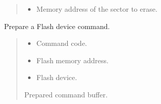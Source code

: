 \documentclass[letterpaper,10pt,english]{sphinxmanual}
\begin{document}
\begin{fulllineitems}
\begin{fulllineitems}
\begin{quote}
\begin{description}
\begin{itemize}
\item {} 
\sphinxAtStartPar
{} \textendash{} Memory address of the sector to erase.

\end{itemize}

\end{description}\end{quote}

\end{fulllineitems}


\begin{fulllineitems}
\label{\detokenize{cplddocs:management_flash.MngProgFlash.FlashDevice_prepareCommand}}
\pysigstartsignatures
{}
\pysigstopsignatures
\sphinxAtStartPar
Prepare a Flash device command.
\begin{quote}\begin{description}
\begin{itemize}
\item {} 
\sphinxAtStartPar
{} \textendash{} Command code.

\item {} 
\sphinxAtStartPar
{} \textendash{} Flash memory address.

\item {} 
\sphinxAtStartPar
{} \textendash{} Flash device.

\end{itemize}

\sphinxAtStartPar
Prepared command buffer.

\end{description}\end{quote}

\end{fulllineitems}



\end{fulllineitems}
\end{document}
